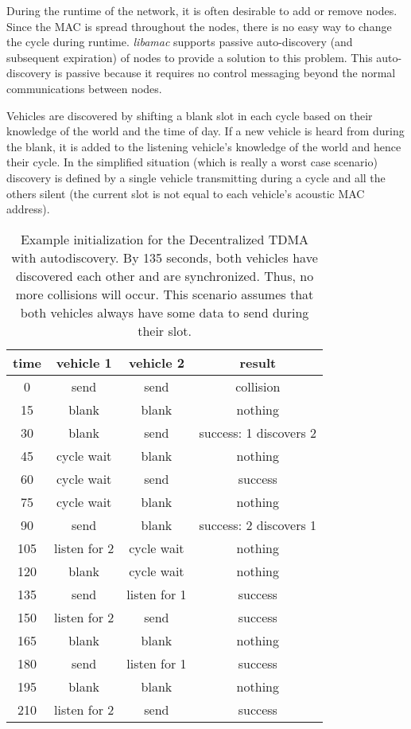 During the runtime of the network, it is often desirable to add or remove nodes. Since the MAC is spread throughout the nodes, there is no easy way to change the cycle during runtime. \textit{libamac} supports passive auto-discovery (and subsequent expiration) of nodes to provide a solution to this problem. This auto-discovery is passive because it requires no control messaging beyond the normal communications between nodes.

Vehicles are discovered by shifting a blank slot in each cycle based on their knowledge of the world and the time of day. If a new vehicle is heard from during the blank, it is added to the listening vehicle's knowledge of the world and hence their cycle. In the simplified situation (which is really a worst case scenario) discovery is defined by a single vehicle transmitting during a cycle and all the others silent (the current slot is not equal to each vehicle's acoustic MAC address).

\begin{table}
\centering
\begin{tabular}{|c|c|c|c|}
\hline time & vehicle 1 & vehicle 2 & result \\ 
\hline 0   & send       & send  & collision \\ 
\hline 15  & blank      & blank & nothing \\ 
\hline 30  & blank      & send  & success: 1 discovers 2 \\ 
\hline 45  & cycle wait & blank & nothing \\ 
\hline 60  & cycle wait & send  & success \\ 
\hline 75  & cycle wait & blank & nothing \\ 
\hline 90  & send       & blank & success: 2 discovers 1 \\ 
\hline 105 & listen for 2 & cycle wait & nothing \\ 
\hline 120 & blank & cycle wait & nothing \\ 
\hline 135 & send & listen for 1 & success \\ 
\hline 150 & listen for 2 & send & success \\ 
\hline 165 & blank & blank & nothing \\ 
\hline 180 & send & listen for 1 & success \\ 
\hline 195 & blank & blank & nothing \\ 
\hline 210 & listen for 2 & send & success \\ 
\hline 
\end{tabular} 
\caption{Example initialization for the Decentralized TDMA with autodiscovery. By 135 seconds, both vehicles have discovered each other and are synchronized. Thus, no more collisions will occur. This scenario assumes that both vehicles always have some data to send during their slot.}
\end{table}

